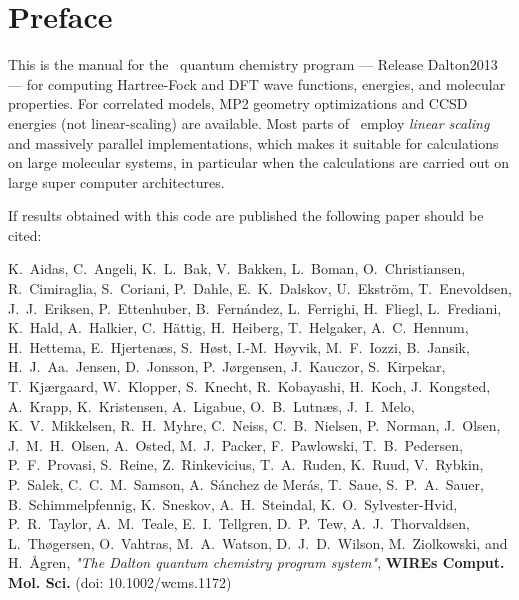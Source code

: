 
\chapter*{Preface}

This is the manual for the \lsdalton\ quantum chemistry program
--- Release Dalton2013 --- for computing Hartree-Fock and DFT
wave functions, energies, and molecular properties.
For correlated models, 
MP2 geometry optimizations and CCSD energies (not linear-scaling) are available.
Most parts of \lsdalton\ employ {\em linear scaling} and massively parallel implementations, which makes it suitable for calculations on large molecular systems, in particular when the calculations are carried out on large super computer architectures.



If results obtained with this code are published the following paper should be cited:

\vspace{0.5 cm}

\noindent K.~Aidas, C.~Angeli, K.~L.~Bak, V.~Bakken,
        L.~Boman, O.~Christiansen, R.~Cimiraglia, S.~Coriani,
        P.~Dahle, E.~K.~Dalskov, U.~Ekstr\"{o}m, T.~Enevoldsen,
        J.~J.~Eriksen, P.~Ettenhuber, B.~Fern\'{a}ndez,
        L.~Ferrighi, H.~Fliegl, L.~Frediani, K.~Hald,
        A.~Halkier, C.~H\"{a}ttig, H.~Heiberg,
        T.~Helgaker, A.~C.~Hennum, H.~Hettema,
        E.~Hjerten\ae{}s, S.~H\o{}st, I.-M.~H\o{}yvik,
        M.~F.~Iozzi, B.~Jansik, H.~J.~Aa.~Jensen,
        D.~Jonsson, P.~J\o{}rgensen, J.~Kauczor,
        S.~Kirpekar, T.~Kj\ae{}rgaard, W.~Klopper,
        S.~Knecht, R.~Kobayashi, H.~Koch, J.~Kongsted,
        A.~Krapp, K.~Kristensen, A.~Ligabue,
        O.~B.~Lutn\ae{}s, J.~I.~Melo, K.~V.~Mikkelsen, R.~H.~Myhre,
        C.~Neiss, C.~B.~Nielsen, P.~Norman,
        J.~Olsen, J.~M.~H.~Olsen, A.~Osted,
        M.~J.~Packer, F.~Pawlowski, T.~B.~Pedersen,
        P.~F.~Provasi, S.~Reine, Z.~Rinkevicius,
        T.~A.~Ruden, K.~Ruud, V.~Rybkin,
        P.~Salek, C.~C.~M.~Samson, A.~S\'{a}nchez de Mer\'{a}s,
        T.~Saue, S.~P.~A.~Sauer, B.~Schimmelpfennig,
        K.~Sneskov, A.~H.~Steindal, K.~O.~Sylvester-Hvid,
        P.~R.~Taylor, A.~M.~Teale, E.~I.~Tellgren,
        D.~P.~Tew, A.~J.~Thorvaldsen, L.~Th\o{}gersen,
        O.~Vahtras, M.~A.~Watson, D.~J.~D.~Wilson,
        M.~Ziolkowski, and H.~\AA{}gren,
\textit{"The Dalton quantum chemistry program system"}, \textbf{WIREs Comput. Mol. Sci.} (doi: 10.1002/wcms.1172)

